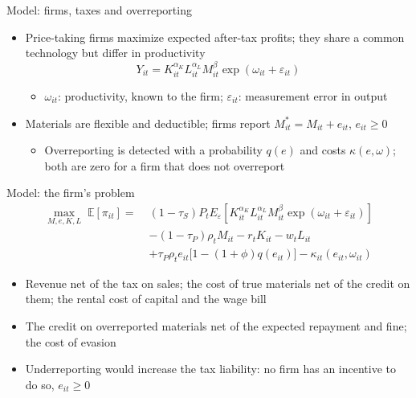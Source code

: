\documentclass[
  ignorenonframetext,
  aspectratio=169,
]{beamer}
\providecommand{\tightlist}{%
  \setlength{\itemsep}{0pt}\setlength{\parskip}{0pt}}
\begin{document}
\begin{frame}{Model: firms, taxes and overreporting}
\protect{}\label{model-firms-taxes-and-overreporting}
\begin{itemize}
\tightlist
\item
  Price-taking firms maximize expected after-tax profits; they share a
  common technology but differ in productivity \[
  Y_{it}=K_{it}^{\alpha_K}L_{it}^{\alpha_L}M_{it}^{\beta}\exp(\omega_{it}+\varepsilon_{it})
  \]

  \begin{itemize}
  \tightlist
  \item
    \(\omega_{it}\): productivity, known to the firm;
    \(\varepsilon_{it}\): measurement error in output
  \end{itemize}
\item
  Materials are flexible and deductible; firms report
  \(M^*_{it}=M_{it}+e_{it}\), \(e_{it}\ge0\)

  \begin{itemize}
  \tightlist
  \item
    Overreporting is detected with a probability \(q(e)\) and costs
    \(\kappa(e,\omega)\); both are zero for a firm that does not
    overreport
  \end{itemize}
\end{itemize}
\end{frame}

\begin{frame}{Model: the firm's problem}
\protect{}\label{model-the-firms-problem}
\[
\begin{aligned}
  \max_{M,e,K,L}\;\mathbb{E}[\pi_{it}] = \;&(1-\tau_S)P_t E_{\varepsilon}[K_{it}^{\alpha_K}L_{it}^{\alpha_L}M_{it}^{\beta}\exp(\omega_{it}+\varepsilon_{it})]\\
  &-(1-\tau_P)\rho_tM_{it}-r_tK_{it}-w_tL_{it}\\
  &+\tau_P\rho_te_{it}\big[1-(1+\phi)q(e_{it})\big]-\kappa_{it}(e_{it},\omega_{it})
\end{aligned}
\]

\begin{itemize}
\tightlist
\item
  Revenue net of the tax on sales; the cost of true materials net of the
  credit on them; the rental cost of capital and the wage bill
\item
  The credit on overreported materials net of the expected repayment and
  fine; the cost of evasion
\item
  Underreporting would increase the tax liability: no firm has an
  incentive to do so, \(e_{it}\ge0\)
\end{itemize}
\end{frame}
\end{document}
